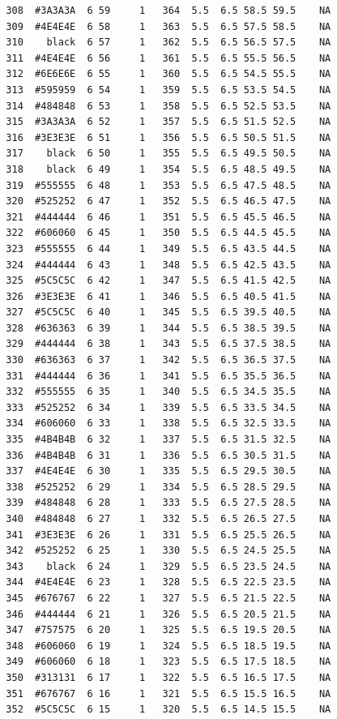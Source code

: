 \documentclass[12pt,twoside]{reedthesis}
\begin{document}
\begin{verbatim}
  308  #3A3A3A  6 59     1   364  5.5  6.5 58.5 59.5    NA
  309  #4E4E4E  6 58     1   363  5.5  6.5 57.5 58.5    NA
  310    black  6 57     1   362  5.5  6.5 56.5 57.5    NA
  311  #4E4E4E  6 56     1   361  5.5  6.5 55.5 56.5    NA
  312  #6E6E6E  6 55     1   360  5.5  6.5 54.5 55.5    NA
  313  #595959  6 54     1   359  5.5  6.5 53.5 54.5    NA
  314  #484848  6 53     1   358  5.5  6.5 52.5 53.5    NA
  315  #3A3A3A  6 52     1   357  5.5  6.5 51.5 52.5    NA
  316  #3E3E3E  6 51     1   356  5.5  6.5 50.5 51.5    NA
  317    black  6 50     1   355  5.5  6.5 49.5 50.5    NA
  318    black  6 49     1   354  5.5  6.5 48.5 49.5    NA
  319  #555555  6 48     1   353  5.5  6.5 47.5 48.5    NA
  320  #525252  6 47     1   352  5.5  6.5 46.5 47.5    NA
  321  #444444  6 46     1   351  5.5  6.5 45.5 46.5    NA
  322  #606060  6 45     1   350  5.5  6.5 44.5 45.5    NA
  323  #555555  6 44     1   349  5.5  6.5 43.5 44.5    NA
  324  #444444  6 43     1   348  5.5  6.5 42.5 43.5    NA
  325  #5C5C5C  6 42     1   347  5.5  6.5 41.5 42.5    NA
  326  #3E3E3E  6 41     1   346  5.5  6.5 40.5 41.5    NA
  327  #5C5C5C  6 40     1   345  5.5  6.5 39.5 40.5    NA
  328  #636363  6 39     1   344  5.5  6.5 38.5 39.5    NA
  329  #444444  6 38     1   343  5.5  6.5 37.5 38.5    NA
  330  #636363  6 37     1   342  5.5  6.5 36.5 37.5    NA
  331  #444444  6 36     1   341  5.5  6.5 35.5 36.5    NA
  332  #555555  6 35     1   340  5.5  6.5 34.5 35.5    NA
  333  #525252  6 34     1   339  5.5  6.5 33.5 34.5    NA
  334  #606060  6 33     1   338  5.5  6.5 32.5 33.5    NA
  335  #4B4B4B  6 32     1   337  5.5  6.5 31.5 32.5    NA
  336  #4B4B4B  6 31     1   336  5.5  6.5 30.5 31.5    NA
  337  #4E4E4E  6 30     1   335  5.5  6.5 29.5 30.5    NA
  338  #525252  6 29     1   334  5.5  6.5 28.5 29.5    NA
  339  #484848  6 28     1   333  5.5  6.5 27.5 28.5    NA
  340  #484848  6 27     1   332  5.5  6.5 26.5 27.5    NA
  341  #3E3E3E  6 26     1   331  5.5  6.5 25.5 26.5    NA
  342  #525252  6 25     1   330  5.5  6.5 24.5 25.5    NA
  343    black  6 24     1   329  5.5  6.5 23.5 24.5    NA
  344  #4E4E4E  6 23     1   328  5.5  6.5 22.5 23.5    NA
  345  #676767  6 22     1   327  5.5  6.5 21.5 22.5    NA
  346  #444444  6 21     1   326  5.5  6.5 20.5 21.5    NA
  347  #757575  6 20     1   325  5.5  6.5 19.5 20.5    NA
  348  #606060  6 19     1   324  5.5  6.5 18.5 19.5    NA
  349  #606060  6 18     1   323  5.5  6.5 17.5 18.5    NA
  350  #313131  6 17     1   322  5.5  6.5 16.5 17.5    NA
  351  #676767  6 16     1   321  5.5  6.5 15.5 16.5    NA
  352  #5C5C5C  6 15     1   320  5.5  6.5 14.5 15.5    NA

\end{verbatim}
\end{document}
